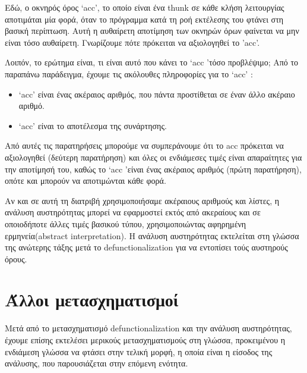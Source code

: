 \documentclass[diploma]{softlab-thesis}
\begin{document}
Εδώ, ο οκνηρός όρος `acc', το οποίο είναι ένα thunk σε κάθε κλήση λειτουργίας αποτιμάται μία φορά,
όταν το πρόγραμμα κατά τη ροή εκτέλεσης του φτάνει στη βασική περίπτωση. Αυτή η αυθαίρετη αποτίμηση 
των οκνηρών όρων φαίνεται να μην είναι τόσο αυθαίρετη. Γνωρίζουμε πότε πρόκειται να αξιολογηθεί το 
'acc'.

Λοιπόν, το ερώτημα είναι, τι είναι αυτό που κάνει το `acc 'τόσο προβλέψιμο;
Από το παραπάνω παράδειγμα, έχουμε τις ακόλουθες πληροφορίες για το `acc' :
\begin{itemize}
  \item `acc' είναι ένας ακέραιος αριθμός, που πάντα προστίθεται σε έναν άλλο ακέραιο αριθμό.
  \item `acc' είναι το αποτέλεσμα της συνάρτησης.
\end{itemize}

Από αυτές τις παρατηρήσεις μπορούμε να συμπεράνουμε ότι το acc πρόκειται να αξιολογηθεί 
(δεύτερη παρατήρηση) και όλες οι ενδιάμεσες τιμές είναι απαραίτητες για την αποτίμησή του, καθώς 
το `acc 'είναι ένας ακέραιος αριθμός (πρώτη παρατήρηση), οπότε και μπορούν να αποτιμώνται κάθε φορά.

Αν και σε αυτή τη διατριβή χρησιμοποιήσαμε ακέραιους αριθμούς και λίστες, η ανάλυση αυστηρότητας 
μπορεί να εφαρμοστεί εκτός από ακεραίους και σε οποιοδήποτε άλλες τιμές βασικού τύπου, 
χρησιμοποιώντας αφηρημένη ερμηνεία(abstract interpretation).
Η ανάλυση αυστηρότητας εκτελείται στη γλώσσα της ανώτερης τάξης μετά το defunctionalization για να 
εντοπίσει τούς αυστηρούς όρους.

\section{Άλλοι μετασχηματισμοί}

Μετά από το μετασχηματισμό defunctionalization και την ανάλυση αυστηρότητας, έχουμε επίσης
εκτελέσει μερικούς μετασχηματισμούς στη γλώσσα, προκειμένου η ενδιάμεση
γλώσσα να φτάσει στην τελική μορφή, η οποία είναι η είσοδος της ανάλυσης, που 
παρουσιάζεται στην επόμενη ενότητα.
\end{document}
